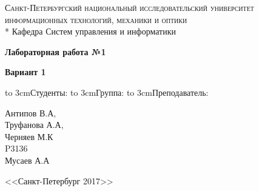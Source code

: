 
\begin{titlepage}

\begin{center}
\textsc{Санкт-Петербургский национальный исследовательский университет 
                информационных технологий, механики и оптики} \\*
\vspace{0.5cm}
Кафедра Систем управления и информатики \\     
   
\end{center}

\vspace{4cm}

\vspace{0.3cm}

\begin{center}
\large{\textbf{Лабораторная работа №1}}
\end{center}
\begin{center}
\large{\textbf{Вариант 1}}
\end{center}
\vspace{1cm}



\vspace{4.5cm}

{\small
\begin{flushright}
\parbox{6cm}{\hbox to 3cm{Студенты:} 
       \hbox to 3cm{Группа:\hfill}
       \hbox to 3cm{Преподаватель:\hfill}}
\parbox{4cm}{Антипов В.А,\\ 
            Труфанова А.А,\\
            Черняев М.К\\
       P3136\\
       Мусаев А.А\\}
\end{flushright}}
\vspace{\fill}  

\begin{center}
<<Санкт-Петербург 2017>>
\end{center}

\end{titlepage}